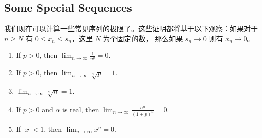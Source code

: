 \documentclass[../poma-notes.tex]{subfiles}
\begin{document}
\subsection*{Some Special Sequences}

我们现在可以计算一些常见序列的极限了。这些证明都将基于以下观察：如果对于 $n \ge N$ 有 $0 \le x_n \le s_n$，这里 $N$ 为个固定的数，
那么如果 $s_n \to 0$ 则有 $x_n \to 0$。

\begin{theorem}
  \begin{enumerate}[label=(\alph*)]
    \item If $p > 0$, then $\lim_{n \to \infty} \frac{1}{n^p} = 0$.
    \item If $p > 0$, then $\lim_{n \to \infty} \sqrt[n]{p} = 1$.
    \item $\lim_{n \to \infty} \sqrt[n]{n} = 1$.
    \item If $p > 0$ and $\alpha$ is real, then $\lim_{n \to \infty} \frac{n^{\alpha}}{(1 + p)^n} = 0$.
    \item If $|x| < 1$, then $\lim_{n \to \infty} x^n = 0$.
  \end{enumerate}
\end{theorem}
\end{document}
